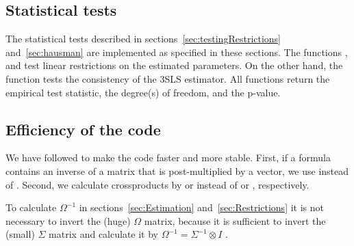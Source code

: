 \subsection{Statistical tests}
The statistical tests described in
sections~\ref{sec:testingRestrictions} and~\ref{sec:hausman}
are implemented as specified in these sections.
The functions ,  and
 test linear restrictions on the
estimated parameters.
On the other hand, the function 
tests the consistency of the 3SLS estimator.
All functions return the empirical test statistic,
the degree(s) of freedom, and the p-value.


\subsection{Efficiency of the code}
We have followed \cite{bates04} to make the code faster and more stable.
First, if a formula contains an inverse of a matrix
that is post-multiplied by a vector,
we use  instead of .
Second, we calculate crossproducts
by  or 
instead of  or ,
respectively.

To calculate $\Omega^{-1}$ in sections~\ref{sec:Estimation}
and~\ref{sec:Restrictions} it is not necessary to invert
the (huge) $\Omega$ matrix,
because it is sufficient to invert the (small) $\Sigma$ matrix and
calculate it by $\Omega^{-1} = \Sigma^{-1} \otimes I$
\citep[p.\ 342]{greene03}.

